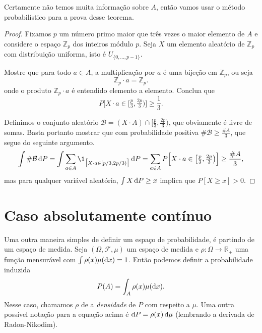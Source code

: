 \begin{topics}
Certamente não temos muita informação sobre $A$, então vamos usar o método probabilístico para a prova desse teorema.

\begin{proof}
  Fixamos $p$ um número primo maior que três vezes o maior elemento de $A$ e considere o espaço $\mathbb{Z}_p$ dos inteiros módulo $p$.
  Seja $X$ um elemento aleatório de $\mathbb{Z}_p$ com distribuição uniforma, isto é $U_{\{0, \dots, p-1\}}$.
  \begin{exercise}
    Mostre que para todo $a \in A$, a multiplicação por $a$ é uma bijeção em $\mathbb{Z}_p$, ou seja
    \begin{equation}
      \mathbb{Z}_p \cdot a = \mathbb{Z}_p.
    \end{equation}
    onde o produto $\mathbb{Z}_p \cdot a$ é entendido elemento a elemento.
    Conclua que
    \begin{equation}
      P \Big[ X \cdot a \in \big[\tfrac p3, \tfrac {2p}3\big) \Big] \geq \frac 13.
    \end{equation}
  \end{exercise}
  Definimos o conjunto aleatório $\mathcal{B} = (X \cdot A) \cap [\tfrac p3, \tfrac {2p}3)$, que obviamente é livre de somas.
  Basta portanto mostrar que com probabilidade positiva $\# \mathcal{B} \geq \tfrac{\#A}3$, que segue do seguinte argumento.
  \begin{equation*}
    \int \# \mathcal{B} \d P = \int \sum_{a \in A} \1_{\big[ X \cdot a \in [p/3, 2p/3) \big]} \d P = \sum_{a \in A} P \Big[ X \cdot a \in \big[\tfrac p3, \tfrac {2p}3\big) \Big] \geq \frac{\# A}3,
  \end{equation*}
  mas para qualquer variável aleatória, $\int X \mathop{}\!\mathrm{d} P \geq x$ implica que $P[X \geq x] > 0$.
\end{proof}


\end{topics}

\vfill
\pagebreak

\section{Caso absolutamente contínuo}

Uma outra maneira simples de definir um espaço de probabilidade, é partindo de um espaço de medida.
Seja $(\Omega, \mathcal{F}, \mu)$ um espaço de medida e $\rho:\Omega \to \mathbb{R}_+$ uma função mensurável com $\int \rho(x) \mu(\mathop{}\!\mathrm{d} x) = 1$.
Então podemos definir a probabilidade induzida
\begin{equation}
  \label{e:absolutamente_cont}
  P(A) = \int_A \rho(x) \mu(\mathop{}\!\mathrm{d} x).
\end{equation}
Nesse caso, chamamos $\rho$ de a \emph{densidade}  de $P$ com respeito a $\mu$.
Uma outra possível notação para a equação acima é $\mathop{}\!\mathrm{d} P = \rho(x) \mathop{}\!\mathrm{d} \mu$  (lembrando a derivada de Radon-Nikodim).

